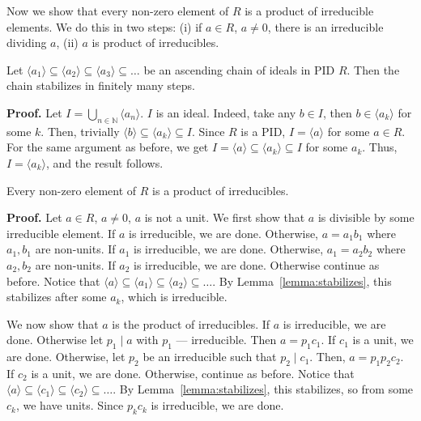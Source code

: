 \documentclass{template}
\begin{document}
Now we show that every non-zero element of $R$ is a product of irreducible
elements. We do this in two steps: (i) if $a \in R$, $a \neq 0$, there is an
irreducible dividing $a$, (ii) $a$ is product of irreducibles.

\begin{lemma}\label{lemma:stabilizes}
    Let $\langle a_1 \rangle \subseteq \langle a_2 \rangle \subseteq \langle a_3
    \rangle \subseteq \dots$ be an ascending chain of ideals in PID $R$. Then
    the chain stabilizes in finitely many steps.
\end{lemma}

\textbf{Proof.} Let $I = \bigcup_{n \in \mathbb{N}} \langle a_n \rangle$. $I$ is
an ideal. Indeed, take any $b \in I$, then $b \in \langle a_k \rangle$ for some
$k$. Then, trivially $\langle b \rangle \subseteq \langle a_k \rangle \subseteq
I$. Since $R$ is a PID, $I = \langle a \rangle$ for some $a \in R$. For the same
argument as before, we get $I = \langle a \rangle \subseteq \langle a_k \rangle
\subseteq I$ for some $a_k$. Thus, $I = \langle a_k \rangle$, and the result
follows.

\begin{proposition}
    Every non-zero element of $R$ is a product of irreducibles.
\end{proposition}

\textbf{Proof.} Let $a \in R$, $a \neq 0$, $a$ is not a unit. We first show that
$a$ is divisible by some irreducible element. If $a$ is irreducible, we are
done. Otherwise, $a=a_1b_1$ where $a_1,b_1$ are non-units. If $a_1$ is
irreducible, we are done. Otherwise, $a_1=a_2b_2$ where $a_2,b_2$ are non-units.
If $a_2$ is irreducible, we are done. Otherwise continue as before. Notice that
$\langle a \rangle \subseteq \langle a_1 \rangle \subseteq \langle a_2 \rangle
\subseteq \dots$. By Lemma~\ref{lemma:stabilizes}, this stabilizes after some
$a_k$, which is irreducible.

We now show that $a$ is the product of irreducibles. If $a$ is irreducible, we
are done. Otherwise let $p_1 \mid a$ with $p_1$ --- irreducible. Then
$a=p_1c_1$. If $c_1$ is a unit, we are done. Otherwise, let $p_2$ be an
irreducible such that $p_2 \mid c_1$. Then, $a=p_1p_2c_2$. If $c_2$ is a unit,
we are done. Otherwise, continue as before. Notice that $\langle a \rangle
\subseteq \langle c_1 \rangle \subseteq \langle c_2 \rangle \subseteq \dots$. By
Lemma~\ref{lemma:stabilizes}, this stabilizes, so from some $c_k$, we have
units. Since $p_kc_k$ is irreducible, we are done.
\end{document}
